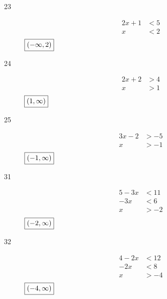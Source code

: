 \documentclass[letterpaper, landscape]{exam}
\begin{document}
\begin{description}
      \item[23] 
        \begin{align*}
          2x + 1 & < 5 \\
          x      & < 2 \\
        \end{align*}
        $\boxed{ \intoo{ -\infty, 2 } }$

      \newpage

      \item[24] 
        \begin{align*}
          2x + 2 & > 4 \\
          x      & > 1 \\
        \end{align*}
        $\boxed{ \intoo{ 1, \infty } }$

      \item[25] 
        \begin{align*}
          3x - 2 & > -5 \\
          x      & > -1 \\
        \end{align*}
        $\boxed{ \intoo{ -1, \infty } }$


      \item[31]
        \begin{align*}
          5 - 3x & < 11 \\
          -3x    & < 6 \\
          x      & > -2 \\
        \end{align*}
        $\boxed{ \intoo{ -2, \infty } }$

      \item[32]
        \begin{align*}
          4 - 2x & < 12 \\
          -2x    & < 8 \\
          x      & > -4 \\
        \end{align*}
        $\boxed{ \intoo{ -4, \infty } }$ 


\end{description}
\end{document}
